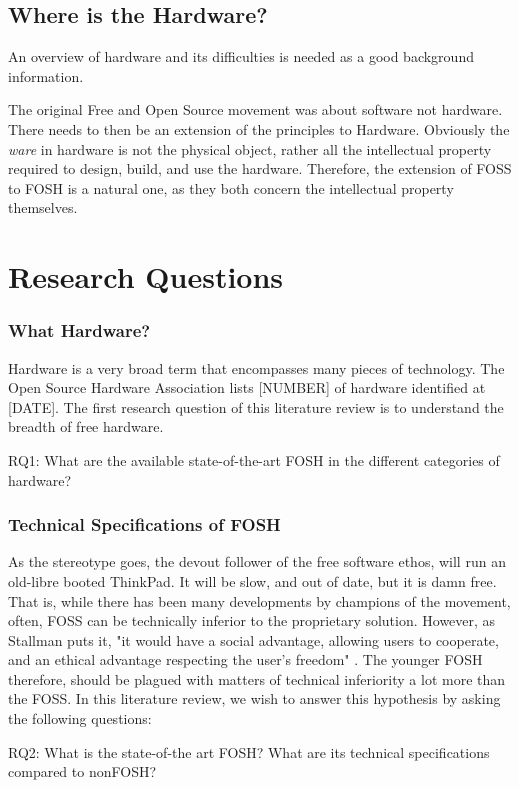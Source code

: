 \documentclass{article}
\begin{document}
\subsection{Where is the Hardware?}
An overview of hardware and its difficulties is needed as a good background information. 

The original Free and Open Source movement was about software not hardware.
There needs to then be an extension of the principles to Hardware.
Obviously the \textit{ware} in hardware is not the physical object, rather all the intellectual property required to design, build, and use the hardware. 
Therefore, the extension of FOSS to FOSH is a natural one, as they both concern the intellectual property themselves. 

\section{Research Questions}
\subsubsection{What Hardware?}
\label{RQ1}
Hardware is a very broad term that encompasses many pieces of technology.
The Open Source Hardware Association lists [NUMBER] of hardware identified at [DATE].
The first research question of this literature review is to understand the breadth of free hardware.

RQ1: What are the available state-of-the-art FOSH in the different categories of hardware?

\subsubsection{Technical Specifications of FOSH}
As the stereotype goes, the devout follower of the free software ethos, will run an old-libre booted ThinkPad.
It will be slow, and out of date, but it is damn free. 
That is, while there has been many developments by champions of the movement, often, FOSS can be technically inferior to the proprietary solution. 
However, as Stallman puts it, "it would have a social advantage, allowing users to cooperate, and an ethical advantage respecting the user's freedom" \cite{b0_stallman}.
The younger FOSH therefore, should be plagued with matters of technical inferiority a lot more than the FOSS. 
In this literature review, we wish to answer this hypothesis by asking the following questions:

RQ2: What is the state-of-the art FOSH? What are its technical specifications compared to nonFOSH? 
\end{document}
